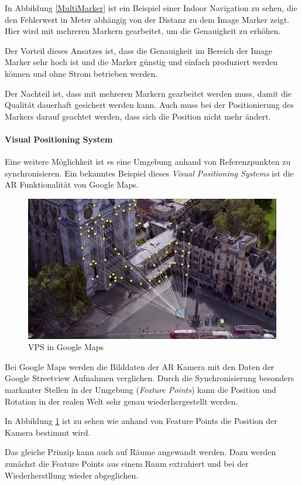 \documentclass[titlepage, a4paper, 11pt]{scrartcl}
\begin{document}
  In Abbildung \ref{MultiMarker} ist ein Beispiel einer Indoor Navigation zu sehen, die den Fehlerwert in Meter abhängig von der Distanz zu dem Image Marker zeigt.
  Hier wird mit mehreren Markern gearbeitet, um die Genauigkeit zu erhöhen.

  Der Vorteil dieses Ansatzes ist, dass die Genauigkeit im Bereich der Image Marker sehr hoch ist und die Marker günstig und einfach produziert werden können und ohne Strom betrieben werden.

  Der Nachteil ist, dass mit mehreren Markern gearbeitet werden muss, damit die Qualität dauerhaft gesichert werden kann. Auch muss bei der Positionierung des Markers darauf geachtet werden, dass sich die Position nicht mehr ändert.

  \paragraph{Visual Positioning System}

  Eine weitere Möglichkeit ist es eine Umgebung anhand von Referenzpunkten zu synchronisieren.
  Ein bekanntes Beispiel dieses \textit{Visual Positioning Systems} ist die AR Funktionalität von Google Maps.
  
  \begin{figure}[h]
    \centering
    \includegraphics[width=.5\textwidth]{vps-google}
    \caption{VPS in Google Maps \cite{GoogleMa12:online}}
    \label{VPSGoogle}
  \end{figure}

  Bei Google Maps werden die Bilddaten der AR Kamera mit den Daten der Google Streetview Aufnahmen verglichen.
  Durch die Synchronisierung besonders markanter Stellen in der Umgebung (\textit{Feature Points}) kann die Position und Rotation in der realen Welt sehr genau wiederhergestellt werden.

  In Abbildung \ref{VPSGoogle} ist zu sehen wie anhand von Feature Points die Position der Kamera bestimmt wird.

  Das gleiche Prinzip kann auch auf Räume angewandt werden. Dazu werden zunächst die Feature Points aus einem Raum extrahiert und bei der Wiederherstllung wieder abgeglichen.
\end{document}
